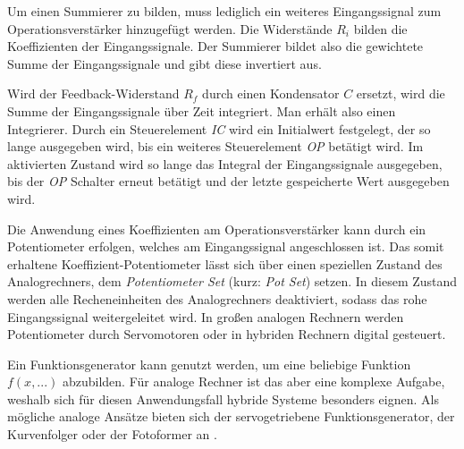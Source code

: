 Um einen Summierer zu bilden, muss lediglich ein weiteres Eingangssignal zum Operationsverstärker hinzugefügt werden. Die Widerstände \(R_i\) bilden die Koeffizienten der Eingangssignale. Der Summierer bildet also die gewichtete Summe der Eingangssignale und gibt diese invertiert aus. \cite[vgl. S. 86]{Ulmann2022}

Wird der Feedback-Widerstand \(R_f\) durch einen Kondensator \(C\) ersetzt, wird die Summe der Eingangssignale über Zeit integriert. Man erhält also einen Integrierer. Durch ein Steuerelement \textit{IC} wird ein Initialwert festgelegt, der so lange ausgegeben wird, bis ein weiteres Steuerelement \textit{OP} betätigt wird. Im aktivierten Zustand wird so lange das Integral der Eingangssignale ausgegeben, bis der \textit{OP} Schalter erneut betätigt und der letzte gespeicherte Wert ausgegeben wird. \cite[vgl. S. 89 ff.]{Ulmann2022}

Die Anwendung eines Koeffizienten am Operationsverstärker kann durch ein Potentiometer erfolgen, welches am Eingangssignal angeschlossen ist. Das somit erhaltene Koeffizient-Potentiometer lässt sich über einen speziellen Zustand des Analogrechners, dem \textit{Potentiometer Set} (kurz: \textit{Pot Set}) setzen. In diesem Zustand werden alle Recheneinheiten des Analogrechners deaktiviert, sodass das rohe Eingangssignal weitergeleitet wird. In großen analogen Rechnern werden Potentiometer durch Servomotoren oder in hybriden Rechnern digital gesteuert. \cite[vgl. S. 92 ff.]{Ulmann2022}

Ein Funktionsgenerator kann genutzt werden, um eine beliebige Funktion \(f(x,...)\) abzubilden. Für analoge Rechner ist das aber eine komplexe Aufgabe, weshalb sich für diesen Anwendungsfall hybride Systeme besonders eignen. Als mögliche analoge Ansätze bieten sich der servogetriebene Funktionsgenerator, der Kurvenfolger oder der Fotoformer an \cite[vgl. S. 97 ff.]{Ulmann2022}.

